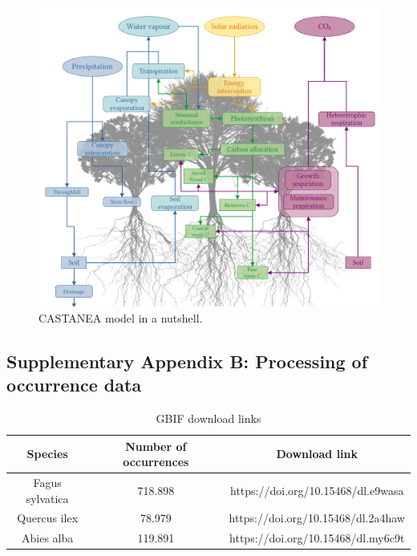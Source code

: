 \begin{figure}[htbp]
\centering \includegraphics{chapter1/figs/supp/castanea_schema}
\caption{CASTANEA model in a nutshell.}\label{figS:castanea_model}
\end{figure}

\newpage

\subsection{Supplementary Appendix B: Processing of occurrence
data}\label{chap1:appendixB}





\begin{table}[!h]

\caption{\label{tab:unnamed-chunk-1}GBIF download links}
\centering
\begin{tabular}[t]{ccc}
\toprule
Species & Number of occurrences & Download link\\
\midrule
Fagus sylvatica & 718.898 & https://doi.org/10.15468/dl.e9wasa\\
Quercus ilex & 78.979 & https://doi.org/10.15468/dl.2a4haw\\
Abies alba & 119.891 & https://doi.org/10.15468/dl.my6c9t\\
\bottomrule
\end{tabular}
\end{table}

